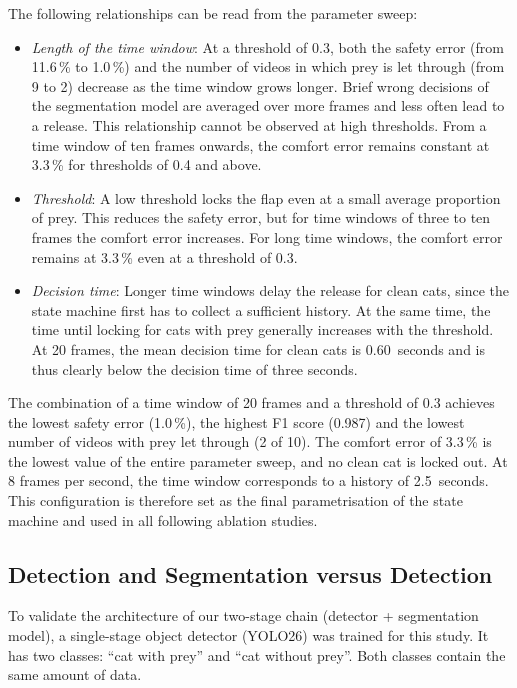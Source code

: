 The following relationships can be read from the parameter sweep:

\begin{itemize}
    \item \emph{Length of the time window}: At a threshold of 0.3, both the safety error (from 11.6\,\% to 1.0\,\%) and the number of videos in which prey is let through (from 9 to 2) decrease as the time window grows longer. Brief wrong decisions of the segmentation model are averaged over more frames and less often lead to a release. This relationship cannot be observed at high thresholds. From a time window of ten frames onwards, the comfort error remains constant at 3.3\,\% for thresholds of 0.4 and above.
    \item \emph{Threshold}: A low threshold locks the flap even at a small average proportion of prey. This reduces the safety error, but for time windows of three to ten frames the comfort error increases. For long time windows, the comfort error remains at 3.3\,\% even at a threshold of 0.3.
    \item \emph{Decision time}: Longer time windows delay the release for clean cats, since the state machine first has to collect a sufficient history. At the same time, the time until locking for cats with prey generally increases with the threshold. At 20 frames, the mean decision time for clean cats is 0.60~seconds and is thus clearly below the decision time of three seconds.
\end{itemize}

The combination of a time window of 20 frames and a threshold of 0.3 achieves the lowest safety error (1.0\,\%), the highest F1 score (0.987) and the lowest number of videos with prey let through (2 of 10). The comfort error of 3.3\,\% is the lowest value of the entire parameter sweep, and no clean cat is locked out. At 8 frames per second, the time window corresponds to a history of 2.5~seconds. This configuration is therefore set as the final parametrisation of the state machine and used in all following ablation studies.

\subsection{Detection and Segmentation versus Detection}
\label{sec:ablation_1stage}
To validate the architecture of our two-stage chain (detector + segmentation model), a single-stage object detector (YOLO26) was trained for this study. It has two classes: ``cat with prey'' and ``cat without prey''. Both classes contain the same amount of data.

